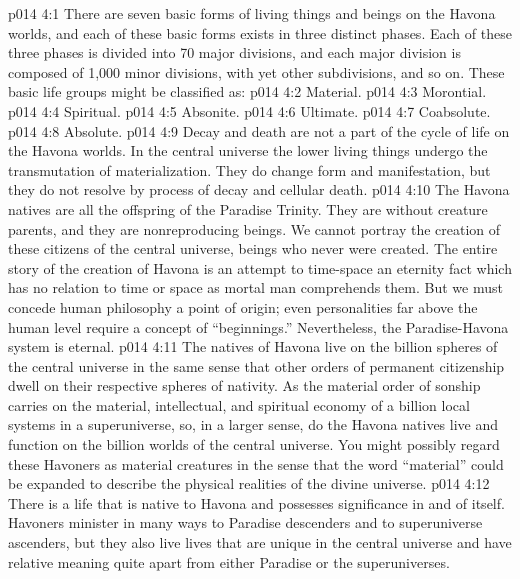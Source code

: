 \vs p014 4:1 There are seven basic forms of living things and beings on the Havona worlds, and each of these basic forms exists in three distinct phases. Each of these three phases is divided into 70 major divisions, and each major division is composed of 1,000 minor divisions, with yet other subdivisions, and so on. These basic life groups might be classified as:
\vs p014 4:2 \bibnobreakspace Material.
\vs p014 4:3 \bibnobreakspace Morontial.
\vs p014 4:4 \bibnobreakspace Spiritual.
\vs p014 4:5 \bibnobreakspace Absonite.
\vs p014 4:6 \bibnobreakspace Ultimate.
\vs p014 4:7 \bibnobreakspace Coabsolute.
\vs p014 4:8 \bibnobreakspace Absolute.
\vs p014 4:9 \pc Decay and death are not a part of the cycle of life on the Havona worlds. In the central universe the lower living things undergo the transmutation of materialization. They do change form and manifestation, but they do not resolve by process of decay and cellular death.
\vs p014 4:10 \pc The Havona natives are all the offspring of the Paradise Trinity. They are without creature parents, and they are nonreproducing beings. We cannot portray the creation of these citizens of the central universe, beings who never were created. The entire story of the creation of Havona is an attempt to time\hyp{}space an eternity fact which has no relation to time or space as mortal man comprehends them. But we must concede human philosophy a point of origin; even personalities far above the human level require a concept of “beginnings.” Nevertheless, the Paradise\hyp{}Havona system is eternal.
\vs p014 4:11 The natives of Havona live on the billion spheres of the central universe in the same sense that other orders of permanent citizenship dwell on their respective spheres of nativity. As the material order of sonship carries on the material, intellectual, and spiritual economy of a billion local systems in a superuniverse, so, in a larger sense, do the Havona natives live and function on the billion worlds of the central universe. You might possibly regard these Havoners as material creatures in the sense that the word “material” could be expanded to describe the physical realities of the divine universe.
\vs p014 4:12 There is a life that is native to Havona and possesses significance in and of itself. Havoners minister in many ways to Paradise descenders and to superuniverse ascenders, but they also live lives that are unique in the central universe and have relative meaning quite apart from either Paradise or the superuniverses.
